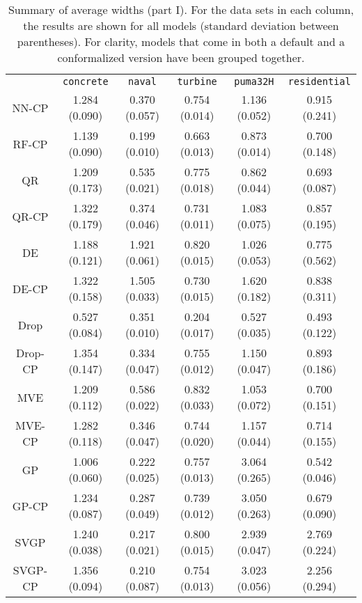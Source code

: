 \documentclass[smallcondensed]{svjour3}
\begin{document}
\begin{appendices}
    \begin{table}[ht!]
        \scriptsize
        \centering
        \renewcommand{\arraystretch}{1.5}
        \begin{tabular}{c||c|c|c|c|c}
            &\texttt{concrete}&\texttt{naval}&\texttt{turbine}&\texttt{puma32H}&\texttt{residential}\\
            \hhline{======}
            NN-CP&1.284 (0.090)&0.370 (0.057)&0.754 (0.014)&1.136 (0.052)&0.915 (0.241)\\
            \hdashline
            RF-CP&1.139 (0.090)&0.199 (0.010)&0.663 (0.013)&0.873 (0.014)&0.700 (0.148)\\
            \hdashline
            QR&1.209 (0.173)&0.535 (0.021)&0.775 (0.018)&0.862 (0.044)&0.693 (0.087)\\
            QR-CP&1.322 (0.179)&0.374 (0.046)&0.731 (0.011)&1.083 (0.075)&0.857 (0.195)\\
            \hdashline
            DE&1.188 (0.121)&1.921 (0.061)&0.820 (0.015)&1.026 (0.053)&0.775 (0.562)\\
            DE-CP&1.322 (0.158)&1.505 (0.033)&0.730 (0.015)&1.620 (0.182)&0.838 (0.311)\\
            \hdashline
            Drop&0.527 (0.084)&0.351 (0.010)&0.204 (0.017)&0.527 (0.035)&0.493 (0.122)\\
            Drop-CP&1.354 (0.147)&0.334 (0.047)&0.755 (0.012)&1.150 (0.047)&0.893 (0.186)\\
            \hdashline
            MVE&1.209 (0.112)&0.586 (0.022)&0.832 (0.033)&1.053 (0.072)&0.700 (0.151)\\
            MVE-CP&1.282 (0.118)&0.346 (0.047)&0.744 (0.020)&1.157 (0.044)&0.714 (0.155)\\
            \hdashline
            GP&1.006 (0.060)&0.222 (0.025)&0.757 (0.013)&3.064 (0.265)&0.542 (0.046)\\
            GP-CP&1.234 (0.087)&0.287 (0.049)&0.739 (0.012)&3.050 (0.263)&0.679 (0.090)\\
            \hdashline
            SVGP&1.240 (0.038)&0.217 (0.021)&0.800 (0.015)&2.939 (0.047)&2.769 (0.224)\\
            SVGP-CP&1.356 (0.094)&0.210 (0.087)&0.754 (0.013)&3.023 (0.056)&2.256 (0.294)\\
        \end{tabular}
        \caption{Summary of average widths (part I). For the data sets in each column, the results are shown for all models (standard deviation between parentheses). For clarity, models that come in both a default and a conformalized version have been grouped together.}
        \label{table:width}
    \end{table}


\end{appendices}
\end{document}
